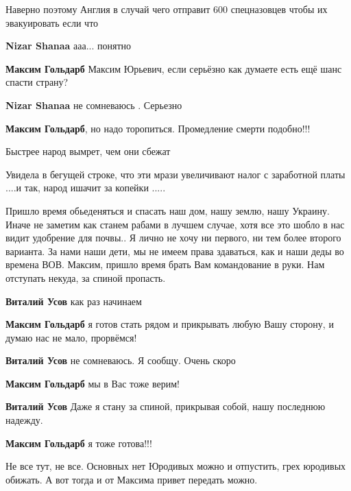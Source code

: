 \begin{itemize}
Наверно поэтому Англия в случай чего отправит 600 спецназовцев чтобы их эвакуировать если что

\begin{itemize} %
\textbf{Nizar Shanaa} ааа... понятно

\textbf{Максим Гольдарб} Максим Юрьевич, если серьёзно как думаете есть ещё шанс спасти страну?

\textbf{Nizar Shanaa} не сомневаюсь . Серьезно

\textbf{Максим Гольдарб}, но надо торопиться. Промедление смерти подобно!!!
\end{itemize} %

Быстрее народ вымрет, чем они сбежат

Увидела в бегущей строке, что эти мрази увеличивают налог с заработной платы ....и так, народ ишачит за копейки .....


Пришло время обьеденяться и спасать наш дом, нашу землю, нашу Украину. Иначе не
заметим как станем рабами в лучшем случае, хотя все это шобло в нас видит
удобрение для почвы.. Я лично не хочу ни первого, ни тем более второго
варианта. За нами наши дети, мы не имеем права здаваться, как и наши деды во
времена ВОВ. Максим, пришло время брать Вам командование в руки. Нам отступать
некуда, за спиной пропасть.

\begin{itemize} %
\textbf{Виталий Усов} как раз начинаем

\textbf{Максим Гольдарб} я готов стать рядом и прикрывать любую Вашу сторону, и думаю нас не мало, прорвёмся!

\textbf{Виталий Усов} не сомневаюсь. Я сообщу. Очень скоро

\textbf{Максим Гольдарб} мы в Вас тоже верим!

\textbf{Виталий Усов} Даже я стану за спиной, прикрывая собой, нашу последнюю надежду.

\textbf{Максим Гольдарб} я тоже готова!!!
\end{itemize} %

Не все тут, не все. Основных нет Юродивых можно и отпустить, грех юродивых обижать. А вот тогда и от Максима привет передать можно.


\end{itemize}
